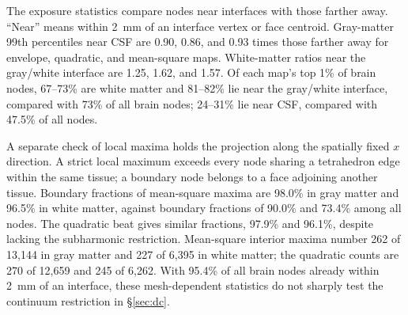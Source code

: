 The exposure statistics compare nodes near interfaces with those farther away. ``Near'' means within 2~mm of an interface vertex or face centroid. Gray-matter 99th percentiles near CSF are 0.90, 0.86, and 0.93 times those farther away for envelope, quadratic, and mean-square maps. White-matter ratios near the gray/white interface are 1.25, 1.62, and 1.57. Of each map's top 1\% of brain nodes, 67--73\% are white matter and 81--82\% lie near the gray/white interface, compared with 73\% of all brain nodes; 24--31\% lie near CSF, compared with 47.5\% of all nodes.

A separate check of local maxima holds the projection along the spatially fixed $x$ direction. A strict local maximum exceeds every node sharing a tetrahedron edge within the same tissue; a boundary node belongs to a face adjoining another tissue. Boundary fractions of mean-square maxima are 98.0\% in gray matter and 96.5\% in white matter, against boundary fractions of 90.0\% and 73.4\% among all nodes. The quadratic beat gives similar fractions, 97.9\% and 96.1\%, despite lacking the subharmonic restriction. Mean-square interior maxima number 262 of 13,144 in gray matter and 227 of 6,395 in white matter; the quadratic counts are 270 of 12,659 and 245 of 6,262. With 95.4\% of all brain nodes already within 2~mm of an interface, these mesh-dependent statistics do not sharply test the continuum restriction in \S\ref{sec:dc}.
